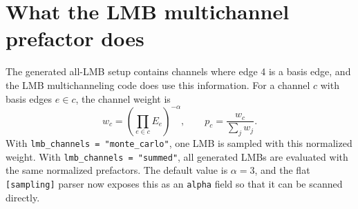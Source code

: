 \documentclass[11pt]{article}
\begin{document}
\section{What the LMB multichannel prefactor does}

The generated all-LMB setup contains channels where edge 4 is a basis edge, and
the LMB multichanneling code does use this information.  For a channel $c$ with
basis edges $e\in c$, the channel weight is
\begin{equation}
  w_c=\left(\prod_{e\in c} E_e\right)^{-\alpha},
  \qquad
  p_c=\frac{w_c}{\sum_j w_j}.
  \label{eq:lmb-channel-weight}
\end{equation}
With \texttt{lmb\_channels = "monte\_carlo"}, one LMB is sampled with this
normalized weight.  With \texttt{lmb\_channels = "summed"}, all generated LMBs
are evaluated with the same normalized prefactors.  The default value is
$\alpha=3$, and the flat \texttt{[sampling]} parser now exposes this as an
\texttt{alpha} field so that it can be scanned directly.
\end{document}
